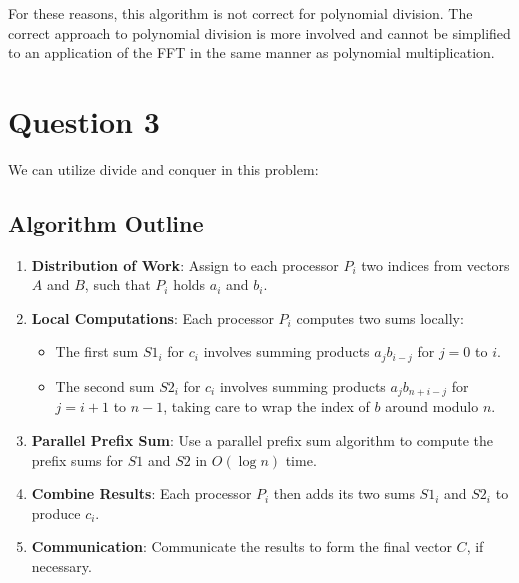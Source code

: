 \documentclass{article}
\begin{document}
For these reasons, this algorithm is not correct for polynomial division. The correct approach to polynomial division is more involved and cannot be simplified to an application of the FFT in the same manner as polynomial multiplication.
\section{Question 3}
We can utilize divide and conquer in this problem:

\subsection*{Algorithm Outline}
\begin{enumerate}
    \item \textbf{Distribution of Work}: Assign to each processor \( P_i \) two indices from vectors \( A \) and \( B \), such that \( P_i \) holds \( a_i \) and \( b_i \).
    \item \textbf{Local Computations}: Each processor \( P_i \) computes two sums locally:
    \begin{itemize}
        \item The first sum \( S1_i \) for \( c_i \) involves summing products \( a_j b_{i-j} \) for \( j = 0 \) to \( i \).
        \item The second sum \( S2_i \) for \( c_i \) involves summing products \( a_j b_{n+i-j} \) for \( j = i+1 \) to \( n-1 \), taking care to wrap the index of \( b \) around modulo \( n \).
    \end{itemize}
    \item \textbf{Parallel Prefix Sum}: Use a parallel prefix sum algorithm to compute the prefix sums for \( S1 \) and \( S2 \) in \( O(\log n) \) time.
    \item \textbf{Combine Results}: Each processor \( P_i \) then adds its two sums \( S1_i \) and \( S2_i \) to produce \( c_i \).
    \item \textbf{Communication}: Communicate the results to form the final vector \( C \), if necessary.
\end{enumerate}
\end{document}
